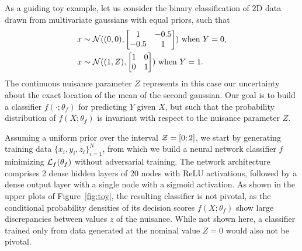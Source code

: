 \documentclass[twocolumn,superscriptaddress,aps]{revtex4-1}
\theoremstyle{plain}
\begin{document}
As a guiding toy example, let us consider the binary classification of 2D
data drawn from multivariate gaussians with equal priors, such that
\begin{align}
    x &\sim {\cal N}((0,0), \begin{bmatrix}
                              1 & -0.5 \\
                              -0.5 & 1
                            \end{bmatrix}) \text{ when } Y=0, \\
    x &\sim {\cal N}((1,Z),  \begin{bmatrix}
                              1 & 0 \\
                              0 & 1
                             \end{bmatrix}) \text{ when } Y=1.
\end{align}
The continuous nuisance parameter $Z$ represents in this case our
uncertainty about the exact location of the mean of the second gaussian. Our goal is to
build a classifier $f(\cdot;\theta_f)$ for predicting $Y$ given $X$, but such that
the probability distribution of $f(X;\theta_f)$ is invariant with respect to the
nuisance parameter $Z$.

Assuming a uniform prior over the interval ${\cal Z} = [0;2]$, we start by
generating training data $\{ x_i, y_i, z_i \}_{i=1}^N$, from which we build a
neural network classifier $f$ minimizing ${\cal L}_f(\theta_f)$ without
adversarial training. The network architecture comprises 2 dense hidden layers of 20
nodes with ReLU activations, followed  by a dense output layer with a single
node with a sigmoid activation. As shown in the upper plots of
Figure~\ref{fig:toy}, the resulting classifier is not pivotal, as the
conditional probability densities of its decision scores $f(X;\theta_f)$ show
large discrepancies between values $z$ of the nuisance. While not shown here, a
classifier trained only from data generated at the nominal value $Z=0$ would
also not be pivotal.
\end{document}
